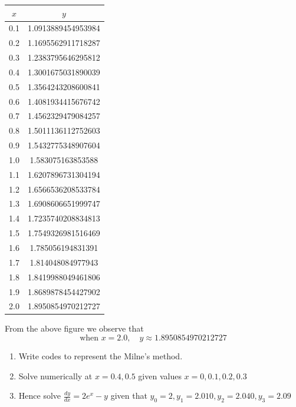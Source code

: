 \documentclass[a4paper,12pt,openany]{book}
\begin{document}
\begin{soln}
\begin{tabular}{|c | c|}
	\hline
	$x$ & $y$ \\
	\hline
	0.1 & 1.0913889454953984\\
	0.2 & 1.1695562911718287\\
	0.3 & 1.2383795646295812\\
	0.4 & 1.3001675031890039\\
	0.5 & 1.3564243208600841\\
	0.6 & 1.4081934415676742\\
	0.7 & 1.4562329479084257\\
	0.8 & 1.5011136112752603\\
	0.9 & 1.5432775348907604\\
	1.0 & 1.583075163853588\\
	1.1 & 1.6207896731304194\\
	1.2 & 1.6566536208533784\\
	1.3 & 1.6908606651999747\\
	1.4 & 1.7235740208834813\\
	1.5 & 1.7549326981516469\\
	1.6 & 1.785056194831391\\
	1.7 & 1.814048084977943\\
	1.8 & 1.8419988049461806\\
	1.9 & 1.8689878454427902\\
	2.0 & 1.8950854970212727\\
	\hline
\end{tabular}


From the above figure we observe that $$\text{when } x = 2.0, \quad y \approx 1.8950854970212727$$
\end{soln}

\begin{problem}
	\begin{enumerate}
		\item Write codes to represent the Milne's method.
		\item Solve numerically at $x = 0.4,0.5$ given values $x = 0,0.1,0.2,0.3$
		\item Hence solve $\frac{dy}{dx} = 2e^x - y$ given that $y_0 = 2, y_1 = 2.010, y_2 = 2.040, y_3 = 2.09$
	\end{enumerate}
\end{problem}
\end{document}
